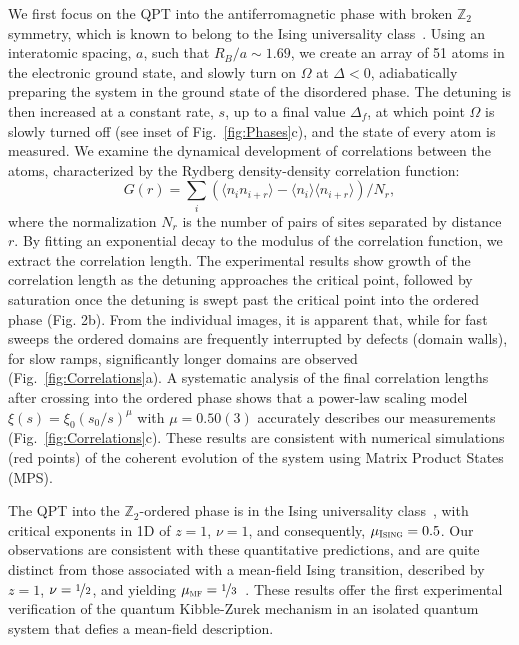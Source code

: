 \documentclass[prl,nobalancelastpage,superscriptaddress,twocolumn,nofootinbib]{revtex4}
\begin{document}
We first focus on the QPT 
 into the antiferromagnetic phase with broken $\mathbb{Z}_2$ symmetry, which is known to belong to the Ising universality class~\cite{Sachdev2009}. Using an interatomic spacing, $a$, such that  $R_B/a \sim 1.69$, we create an array of 51 atoms in the electronic ground state, and 
slowly turn on $\Omega$ at $\Delta<0$, adiabatically preparing the system in the ground state of the disordered phase. The detuning is then increased at a constant rate, $s$, up to a final value $\Delta_f$, at which point $\Omega$ is slowly turned off 
(see inset of Fig.~\ref{fig:Phases}c), and the state of every atom is measured. We examine the dynamical development of correlations between the atoms, characterized by the Rydberg density-density correlation function:
\begin{equation}
\label{eq:Correlation_function}
	G(r) = \sum_i(\langle n_{i}n_{i+r}\rangle - \langle n_i\rangle\langle n_{i+r}\rangle)/N_r,
\end{equation}
where the normalization $N_r$ is the number of pairs of sites separated by distance $r$. By fitting an exponential decay to the modulus of the correlation function, we extract the correlation length. The experimental results show growth of the correlation length as the detuning approaches the critical point, followed by saturation once the detuning is swept past the critical point into the ordered phase (Fig. 2b). From the individual  images, it is apparent that, while for fast sweeps the ordered domains are frequently interrupted by defects (domain walls), for slow ramps, significantly longer domains are observed (Fig.~\ref{fig:Correlations}a).
A systematic analysis of the final correlation lengths after crossing into the ordered phase shows that a power-law scaling model $\xi(s) = \xi_{0}(s_{0}/s)^{\mu}$ with $\mu = 0.50(3)$ accurately describes our measurements (Fig.~\ref{fig:Correlations}c).  These results are consistent with numerical simulations (red points) of the coherent evolution of the system using Matrix Product States (MPS).

The QPT into the $\mathbb{Z}_2$-ordered phase is in the Ising universality class~\cite{Sachdev2009}, with critical exponents in 1D of $z =1$, $\nu = 1$, and consequently, $\mu_{\textsc{Ising}} = 0.5$. Our observations are 
consistent with these quantitative predictions, and are quite distinct from those associated with a mean-field Ising transition, described by $z = 1$, $\nu = \nicefrac{1}{2}$, and yielding $\mu_{\textsc{mf}} = \nicefrac{1}{3}$~\cite{Sachdev2009,Anquez2016}. These results offer the first experimental verification of the quantum Kibble-Zurek mechanism in an isolated quantum system that defies a mean-field description. 
\end{document}
